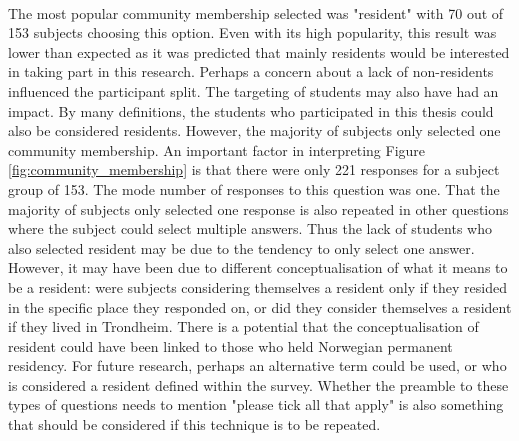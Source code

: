 \paragraph{}
The most popular community membership selected was "resident" with 70 out of 153 subjects choosing this option. Even with its high popularity, this result was lower than expected as it was predicted that mainly residents would be interested in taking part in this research. Perhaps a concern about a lack of non-residents influenced the participant split. The targeting of students may also have had an impact. By many definitions, the students who participated in this thesis could also be considered residents. However, the majority of subjects only selected one community membership. An important factor in interpreting Figure \ref{fig:community_membership} is that there were only 221 responses for a subject group of 153. The mode number of responses to this question was one. That the majority of subjects only selected one response is also repeated in other questions where the subject could select multiple answers. Thus the lack of students who also selected resident may be due to the tendency to only select one answer. However, it may have been due to different conceptualisation of what it means to be a resident: were subjects considering themselves a resident only if they resided in the specific place they responded on, or did they consider themselves a resident if they lived in Trondheim. There is a potential that the conceptualisation of resident could have been linked to those who held Norwegian permanent residency. For future research, perhaps an alternative term could be used, or who is considered a resident defined within the survey. Whether the preamble to these types of questions needs to mention "please tick all that apply" is also something that should be considered if this technique is to be repeated. 
\paragraph{}

